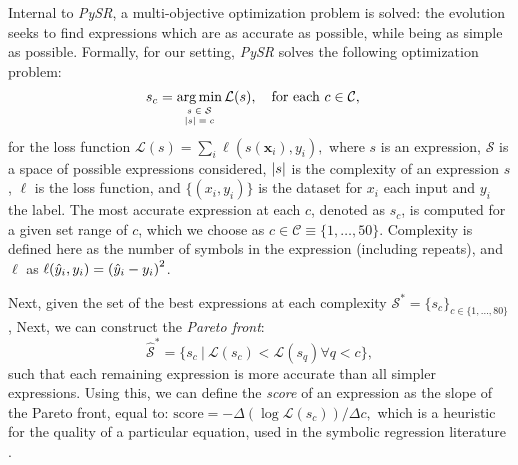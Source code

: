 \documentclass[nohyperref]{article}
\newcommand\pysr{\textit{PySR}\xspace}
\theoremstyle{plain}
\theoremstyle{definition}
\theoremstyle{remark}
\begin{document}
Internal to \pysr, a multi-objective optimization problem is solved: the evolution seeks to find expressions which are as accurate as possible, while being as simple as possible.
Formally, for our setting, \pysr solves the following optimization problem:
\begin{align}
    s_c &= 
        \mathop{\arg\min}_{
            \tiny
            \begin{array}{c}s\in\mathcal{S}\\ \abs{s} = c \end{array}
        }
        \mathcal{L}(s),
    \quad\text{for each } c\in \mathcal{C},
\end{align}
for the loss function $\mathcal{L}(s) = \sum_i \ell(s(\mathbf{x}_i), y_i),$
where $s$ is an expression, 
$\mathcal{S}$ is a space of possible expressions considered,
$\abs{s}$ is the complexity of an expression $s$,
$\ell$ is the loss function, and $\{(x_i, y_i)\}$ is the dataset
for $x_i$ each input and $y_i$ the label.
The most accurate expression at each $c$, denoted as $s_c$, is computed for a given set range of $c$, which we choose as $c\in\mathcal{C}\equiv \{1, \ldots, 50\}$.
Complexity is defined here
as the number of symbols in the expression (including repeats),
and $\ell$ as $\ell(\hat{y}_i, y_i) = \qty(\hat{y}_i - y_i)^2$.

Next, given the set of the best expressions at each complexity $\mathcal{S}^\ast = \{s_c\}_{c\in\{1,\ldots,80\}}$,
Next, we can construct the \textit{Pareto front}:
\begin{equation}
    \hat{\mathcal{S}}^\ast = \{s_c \ |\ \mathcal{L}(s_c) < \mathcal{L}(s_q) \forall q < c \},
\end{equation}
such that each remaining expression is more accurate than all simpler expressions.
Using this, we can define the \textit{score} of an expression as the slope of the Pareto front, equal to: $\text{score} = -\Delta(\log \mathcal{L}(s_c))/\Delta c,$
which is a heuristic for the quality of a particular equation, used in the symbolic regression literature \citep[see, e.g.,][]{schmidtDistillingFreeFormNatural2009,cranmerDiscoveringSymbolicModels2020}.

\end{document}
